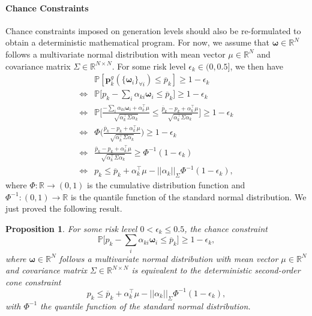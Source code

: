 \documentclass{article}
\newtheorem{proposition}{Proposition}
\begin{document}
\paragraph{Chance Constraints} Chance constraints imposed on generation levels should also be re-formulated to obtain a deterministic mathematical program. For now, we assume that $\boldsymbol{\omega} \in \mathbb{R}^N$ follows a multivariate normal distribution with mean vector $\mu \in \mathbb{R}^N$ and covariance matrix $\Sigma \in \mathbb{R}^{N \times N}$. For some risk level $\epsilon_k \in (0, 0.5]$, we then have
\begin{align*}
&\mathbb{P}[\mathbf{p}_k^g(\{\boldsymbol{\omega}_i\}_{\forall i}) \le \overline{p}_k] \ge 1 - \epsilon_k\\
\Leftrightarrow &\mathbb{P}\Big[p_k - \sum_i \alpha_{ki} \boldsymbol{\omega}_i \le \overline{p}_k\Big] \ge 1 - \epsilon_k\\
\Leftrightarrow &\mathbb{P}\Big[\frac{- \sum_i \alpha_{ki} \boldsymbol{\omega}_i + \alpha_k^\top \mu}{\sqrt{\alpha_k^\top \Sigma \alpha_k}} \le \frac{\overline{p}_k - p_k + \alpha_k^\top \mu}{\sqrt{\alpha_k^\top \Sigma \alpha_k}}\Big] \ge 1 - \epsilon_k\\
\Leftrightarrow & \Phi\bigg(\frac{\overline{p}_k - p_k + \alpha_k^\top \mu}{\sqrt{\alpha_k^\top \Sigma \alpha_k}}\bigg)\ge1-\epsilon_k\\
\Leftrightarrow &\frac{\overline{p}_k - p_k + \alpha_k^\top \mu}{\sqrt{\alpha_k^\top \Sigma \alpha_k}} \ge \Phi^{-1}(1 - \epsilon_k)\\
\Leftrightarrow &p_k \le \overline{p}_k + \alpha_k^\top \mu - ||\alpha_k||_{\Sigma} \Phi^{-1}(1 - \epsilon_k),
\end{align*}
where $\Phi:\mathbb{R} \rightarrow (0, 1)$ is the cumulative distribution function and $\Phi^{-1}: (0, 1) \rightarrow \mathbb{R}$ is the quantile function of the standard normal distribution. We just proved the following result.

\begin{proposition}\label{ND_SOCP_CC}
For some risk level $0 < \epsilon_k \le 0.5$, the chance constraint
\begin{equation*}
\mathbb{P}\Big[p_k - \sum_i \alpha_{ki} \boldsymbol{\omega}_i \le \overline{p}_k\Big] \ge 1 - \epsilon_k,
\end{equation*}
where $\boldsymbol{\omega} \in \mathbb{R}^N$ follows a multivariate normal distribution with mean vector $\mu \in \mathbb{R}^N$ and covariance matrix $\Sigma \in \mathbb{R}^{N \times N}$ is equivalent to the deterministic second-order cone constraint
\begin{equation*}
p_k \le \overline{p}_k + \alpha_k^\top \mu - ||\alpha_k||_{\Sigma} \Phi^{-1}(1 - \epsilon_k),
\end{equation*}
with $\Phi^{-1}$ the quantile function of the standard normal distribution.
\end{proposition}
\end{document}
